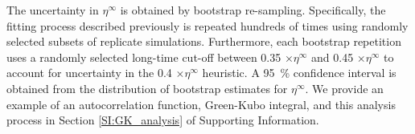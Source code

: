 \documentclass[preprint,review,12pt]{elsarticle}
\begin{document}
	
	The uncertainty in $\eta^{\infty}$ is obtained by bootstrap re-sampling. Specifically, the fitting process described previously is repeated hundreds of times using randomly selected subsets of replicate simulations. Furthermore, each bootstrap repetition uses a randomly selected long-time cut-off between 0.35 $\times \eta^{\infty}$ and 0.45 $\times \eta^{\infty}$ to account for uncertainty in the 0.4 $\times \eta^{\infty}$ heuristic. A 95~\% confidence interval is obtained from the distribution of bootstrap estimates for $\eta^\infty$. We provide an example of an autocorrelation function, Green-Kubo integral, and this analysis process in Section \ref{SI:GK_analysis} of Supporting Information.
	
	
	
\end{document}
